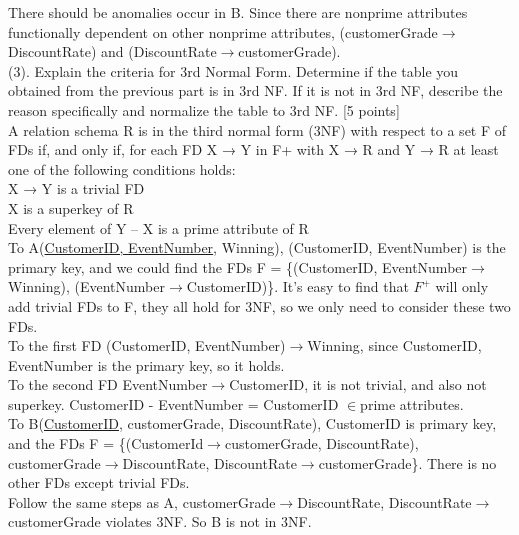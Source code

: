 \documentclass[]{article}
\begin{document}
	\noindent There should be anomalies occur in B. Since there are nonprime attributes functionally dependent on other nonprime attributes, (customerGrade$\rightarrow$DiscountRate) and (DiscountRate$\rightarrow$customerGrade).   \\
	
	\noindent (3). Explain the criteria for 3rd Normal Form. Determine if the table you obtained from the previous part is in 3rd NF. If it is not in 3rd NF, describe the reason specifically and normalize the table to 3rd NF. [5 points]  \\
	
	\noindent A relation schema R is in the third normal form (3NF) with respect to a set F of FDs if, and only if, for each FD X → Y in F+ with X → R and Y → R at least one of the following conditions holds: \\
	
	X → Y is a trivial FD \\
	
	X is a superkey of R \\
	
	Every element of Y – X is a prime attribute of R \\
	
	\noindent To A(\underline{CustomerID, EventNumber}, Winning), (CustomerID, EventNumber) is the primary key, and we could find the FDs F = \{(CustomerID, EventNumber$\rightarrow$Winning), (EventNumber$\rightarrow$CustomerID)\}. It's easy to find that $F^{+}$ will only add trivial FDs to F, they all hold for 3NF, so we only need to consider these two FDs. \\
	
	\noindent To the first FD (CustomerID, EventNumber)$\rightarrow$Winning, since {CustomerID, EventNumber} is the primary key, so it holds.  \\
	
	\noindent To the second FD EventNumber$\rightarrow$CustomerID, it is not trivial, and also not superkey. CustomerID - EventNumber = CustomerID $\in$prime attributes.   \\
	
	\noindent To B(\underline{CustomerID}, customerGrade, DiscountRate), CustomerID is primary key, and the FDs F = \{(CustomerId$\rightarrow$customerGrade, DiscountRate), customerGrade$\rightarrow$DiscountRate, DiscountRate$\rightarrow$customerGrade\}. There is no other FDs except trivial FDs.   \\
	
	\noindent Follow the same steps as A, customerGrade$\rightarrow$DiscountRate, DiscountRate$\rightarrow$customerGrade violates 3NF. So B is not in 3NF.   \\ 
	
\end{document}
